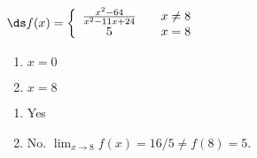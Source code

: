 {$\ds f(x) = \left\{\begin{array}{ccc}
\frac{x^2-64}{x^2-11 x+24}		& &  x\neq 8\\
5 & & x=8
\end{array}\right.
$
\begin{enumerate}
\item		$x=0$
\item		$x=8$
\end{enumerate}
}
{\begin{enumerate}
\item		Yes
\item		No. $\lim_{x\to 8} f(x) = 16/5 \neq f(8) = 5$.
\end{enumerate}
}
